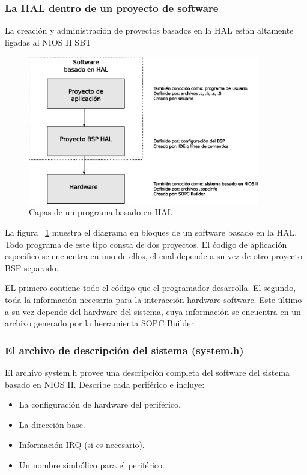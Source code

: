 \subsubsection{La HAL dentro de un proyecto de software}
La creación y administración de proyectos basados en la HAL están altamente ligadas al NIOS II SBT

\begin{figure}[h]
  \centering
	\includegraphics[width=0.90\textwidth]{3-arquitectura/graf/halsof.eps}
  \caption{Capas de un programa basado en HAL}
  \label{fig:halsof}
\end{figure}

La figura ~\ref{fig:halsof} muestra el diagrama en bloques de un software basado en la HAL. Todo programa de este tipo consta de dos proyectos. El ćodigo de aplicación específico se encuentra en uno de ellos, el cual depende a su vez de otro proyecto BSP separado.

EL primero contiene todo el código que el programador desarrolla. El segundo, toda la información necesaria para la interacción hardware-software. Este último a su vez depende del hardware del sistema, cuya información se encuentra en un archivo generado por la herramienta SOPC Builder.

\subsubsection{El archivo de descripción del sistema (system.h)}
El archivo system.h provee una descripción completa del software del sistema basado en NIOS II. Describe cada periférico e incluye:

\begin{itemize}
	\item La configuración de hardware del periférico.
	\item La dirección base.
	\item Información IRQ (si es necesario).
	\item Un nombre simbólico para el periférico.
\end{itemize}


